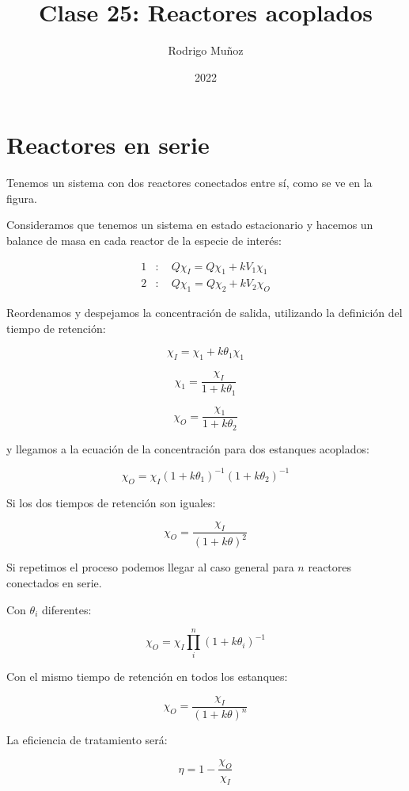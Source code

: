 \documentclass[11pt]{article}
\title{Clase 25: Reactores acoplados}
\author{Rodrigo Muñoz}
\date{2022}
\begin{document}
\maketitle

\section{Reactores en serie}

Tenemos un sistema con dos reactores conectados entre sí, como se ve en la figura.

Consideramos que tenemos un sistema en estado estacionario y hacemos un balance de masa en cada reactor de la especie de interés:

\[ \begin{aligned}
    1 & : \quad Q \chi_I = Q \chi_1 + k V_1 \chi_1 \\
    2 & : \quad Q \chi_1 = Q \chi_2 + k V_2 \chi_O 
\end{aligned} \]

Reordenamos y despejamos la concentración de salida, utilizando la definición del tiempo de retención:

\[ \chi_I = \chi_1 + k \theta_1 \chi_1 \]

\[ \chi_1 = \frac{ \chi_I }{ 1 + k \theta_1 } \]

\[ \chi_O = \frac{ \chi_1 }{ 1 + k \theta_2 } \]

y llegamos a la ecuación de la concentración para dos estanques acoplados:

\[ \boxed{ \chi_O = \chi_I \left( 1 + k \theta_1 \right) ^ {-1} \left( 1 + k \theta_2 \right) ^ {-1} } \]

Si los dos tiempos de retención son iguales:

\[ \boxed{ \chi_O = \frac{ \chi_I }{ \left( 1 + k \theta \right) ^ 2 } } \]

Si repetimos el proceso podemos llegar al caso general para \( n \) reactores conectados en serie.

Con \( \theta_i \) diferentes:

\[ \boxed{ \chi_O = \chi_I \displaystyle\prod_{i}^{n} \left( 1 + k \theta_i \right) ^ {-1} } \]

Con el mismo tiempo de retención en todos los estanques:

\[ \boxed{ \chi_O = \frac{ \chi_I }{ \left( 1 + k \theta \right) ^ n } } \]

La eficiencia de tratamiento será:

\[ \eta = 1 - \frac{ \chi_O }{ \chi_I } \]
\end{document}
